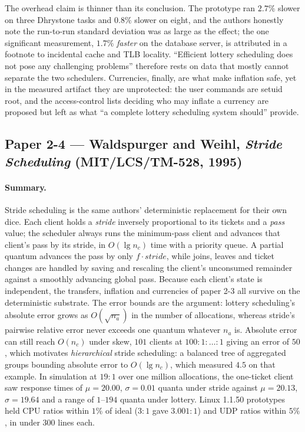 The overhead claim is thinner than its conclusion. The prototype ran $2.7\%$ slower on three
Dhrystone tasks and $0.8\%$ slower on eight, and the authors honestly note the run-to-run
standard deviation was as large as the effect; the one significant measurement, $1.7\%$
\emph{faster} on the database server, is attributed in a footnote to incidental cache and TLB
locality. ``Efficient lottery scheduling does not pose any challenging problems'' therefore rests
on data that mostly cannot separate the two schedulers. Currencies, finally, are what make
inflation safe, yet in the measured artifact they are unprotected: the user commands are setuid
root, and the access-control lists deciding who may inflate a currency are proposed but left as
what ``a complete lottery scheduling system should'' provide.

\subsection*{Paper 2-4 --- Waldspurger and Weihl, \emph{Stride Scheduling} (MIT/LCS/TM-528, 1995)}

\paragraph{Summary.}
Stride scheduling is the same authors' deterministic replacement for their own dice. Each client
holds a \emph{stride} inversely proportional to its tickets and a \emph{pass} value; the
scheduler always runs the minimum-pass client and advances that client's pass by its stride, in
$O(\lg n_c)$ time with a priority queue. A partial quantum advances the pass by only
$f \cdot \mathit{stride}$, while joins, leaves and ticket changes are handled by saving and
rescaling the client's unconsumed remainder against a smoothly advancing global pass. Because
each client's state is independent, the transfers, inflation and currencies of paper 2-3 all
survive on the deterministic substrate. The error
bounds are the argument: lottery scheduling's absolute error grows as $O(\sqrt{n_a})$ in the
number of allocations, whereas stride's pairwise relative error never exceeds one quantum
whatever $n_a$ is. Absolute error can still reach $O(n_c)$ under skew, $101$ clients at
$100\!:\!1\!:\!\dots\!:\!1$ giving an error of $50$, which motivates \emph{hierarchical} stride
scheduling: a balanced tree of aggregated groups bounding absolute error to $O(\lg n_c)$, which
measured $4.5$ on that example. In simulation at $19\!:\!1$ over one million allocations, the
one-ticket client saw response times of $\mu = 20.00$, $\sigma = 0.01$ quanta under stride
against $\mu = 20.13$, $\sigma = 19.64$ and a range of $1$--$194$ quanta under lottery. Linux
1.1.50 prototypes held CPU ratios within $1\%$ of ideal ($3\!:\!1$ gave $3.001\!:\!1$) and UDP
ratios within $5\%$, in under 300 lines each.


